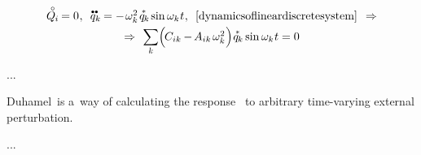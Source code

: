 \nopagebreak\vspace{-0.1em}\begin{equation}
\begin{array}{c}
\mathcircabove{Q}_{\hspace{-0.1ex}i} \hspace{-0.15ex} = 0
\hspace{.1ex} ,
\:\;
\mathdotdotabove{q}_k \hspace{-0.12ex} = - \hspace{.2ex} \omega_k^2 \hspace{.25ex} \mathasteriskabove{q}_{\hspace{-0.1ex}k} \hspace{-0.1ex} \operatorname{sin} \omega_k \hspace{.1ex} t
\hspace{.1ex} ,
\:\;
\eqref{dynamicsoflineardiscretesystem}
\:\: \Rightarrow
\\[.3em]
%
\Rightarrow \:\,
\scalebox{0.95}[1]{$\displaystyle \sum_{\smash{k}}$} \Bigl( \hspace{-0.2ex} C_{ik} \hspace{-0.1ex} - \hspace{-0.2ex} A_{ik} \hspace{.25ex} \omega_k^2 \hspace{.1ex} \Bigr) \hspace{.12ex}
\mathasteriskabove{q}_{\hspace{-0.1ex}k} \operatorname{sin} \omega_k \hspace{.1ex} t
= 0
\end{array}
\end{equation}

...


Duhamel is a~way of calculating the response  to arbitrary time-varying external perturbation.

...

\section*{\small \wordforbibliography}

